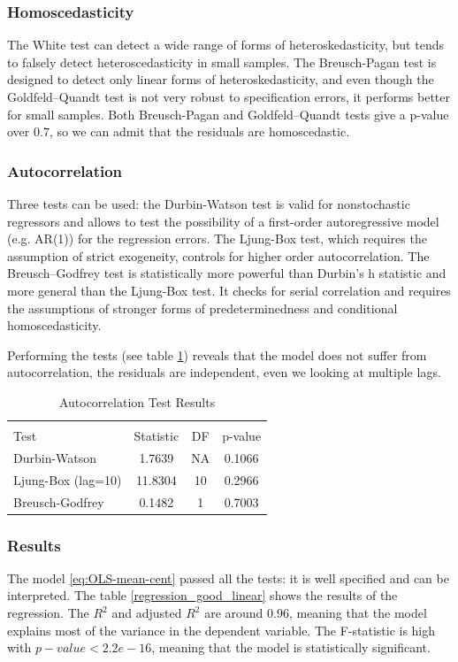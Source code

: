 \subsubsection{Homoscedasticity}
The White test can detect a wide range of forms of heteroskedasticity, but tends to falsely detect heteroscedasticity in small samples. The {Breusch-Pagan} test is designed to detect only linear forms of heteroskedasticity, and even though the Goldfeld–Quandt test is not very robust to specification errors, it performs better for small samples. Both Breusch-Pagan and Goldfeld–Quandt tests give a p-value over $0.7$, so we can admit that the residuals are homoscedastic.

\subsubsection{Autocorrelation}
Three tests can be used: the Durbin-Watson test is valid for nonstochastic regressors and allows to test the possibility of a first-order autoregressive model (e.g. AR(1)) for the regression errors. The Ljung-Box test, which requires the assumption of strict exogeneity, controls for higher order autocorrelation. 
The Breusch–Godfrey test is statistically more powerful than Durbin's h statistic and more general than the {Ljung-Box} test. It checks for serial correlation and requires the assumptions of stronger forms of predeterminedness and conditional homoscedasticity.

Performing the tests (see table \ref{autocorrelation_tests}) reveals that the model does not suffer from autocorrelation, the residuals are independent, even we looking at multiple lags.
\begin{table}[h]
    \centering
    \caption{Autocorrelation Test Results}
    \label{autocorrelation_tests}
    \begin{tabular}{lccc}
    \\[-1.8ex]\hline 
    \hline \\[-1.8ex] 
    Test & Statistic & DF & p-value \\
    \hline
    Durbin-Watson & 1.7639  & NA & 0.1066 \\
    Ljung-Box (lag=10) & 11.8304  & 10 & 0.2966 \\
    Breusch-Godfrey & 0.1482  & 1 & 0.7003 \\
    \hline
    \end{tabular}
\end{table}

\subsubsection{Results}
The model \eqref{eq:OLS-mean-cent} passed all the tests: it is well specified and can be interpreted. The table \ref{regression_good_linear} shows the results of the regression. The $R^2$ and adjusted $R^2$ are around 0.96, meaning that the model explains most of the variance in the dependent variable. The F-statistic is high with $p-value < 2.2e-16$, meaning that the model is statistically significant. 


